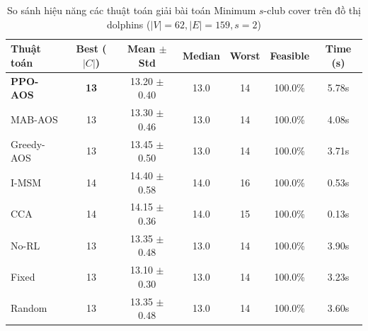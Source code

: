\begin{table}[htbp]
\centering
\caption{So sánh hiệu năng các thuật toán giải bài toán Minimum $s$-club cover trên đồ thị dolphins ($|V|=62, |E|=159, s=2$)}
\label{tab:results_dolphins}
\begin{tabular}{lcccccc}
\hline
\textbf{Thuật toán} & \textbf{Best ($|C|$)} & \textbf{Mean $\pm$ Std} & \textbf{Median} & \textbf{Worst} & \textbf{Feasible} & \textbf{Time (s)} \\
\hline
\textbf{PPO-AOS} & \textbf{13} & 13.20 $\pm$ 0.40 & 13.0 & 14 & 100.0\% & 5.78s \\
MAB-AOS & 13 & 13.30 $\pm$ 0.46 & 13.0 & 14 & 100.0\% & 4.08s \\
Greedy-AOS & 13 & 13.45 $\pm$ 0.50 & 13.0 & 14 & 100.0\% & 3.71s \\
I-MSM & 14 & 14.40 $\pm$ 0.58 & 14.0 & 16 & 100.0\% & 0.53s \\
CCA & 14 & 14.15 $\pm$ 0.36 & 14.0 & 15 & 100.0\% & 0.13s \\
No-RL & 13 & 13.35 $\pm$ 0.48 & 13.0 & 14 & 100.0\% & 3.90s \\
Fixed & 13 & 13.10 $\pm$ 0.30 & 13.0 & 14 & 100.0\% & 3.23s \\
Random & 13 & 13.35 $\pm$ 0.48 & 13.0 & 14 & 100.0\% & 3.60s \\
\hline
\end{tabular}
\end{table}
